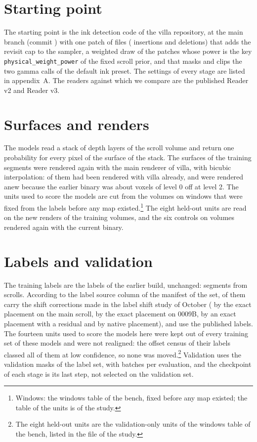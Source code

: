 \section{Starting point}\label{sec:start}

The starting point is the ink detection code of the villa repository, at the main branch (commit \VillaCommit{}) with one patch of \PatchFiles{} files (\PatchIns{} insertions and \PatchDel{} deletions) that adds the revisit cap to the sampler, a weighted draw of the patches whose power is the key \texttt{physical\_weight\_power} of the fixed scroll prior, and that masks and clips the two gamma calls of the default ink preset. The settings of every stage are listed in appendix~A. The readers
against which we compare are the published Reader v2 and Reader v3.

\section{Surfaces and renders}

The models read a stack of \Planes{} depth layers of the scroll volume and return one probability for every pixel
of the surface of the stack. The surfaces of the \TrainSegN{} training segments were rendered again with the main renderer of villa, with bicubic interpolation: \GroupZeroN{} of them had been rendered with villa already, and \GroupTwoN{} were rendered anew because the earlier binary was about \RampVox{} voxels of level 0 off at level 2. The units used to score the
models are cut from the volumes on windows that were fixed from the
labels before any map existed.\footnote{Windows: the windows table of the bench, fixed before
any map existed; the table of the units is  of the study.} The eight held-out units are read on the new renders of the training volumes, and the six controls on volumes rendered again with the current binary.

\section{Labels and validation}\label{sec:labels}

The training labels are the labels of the earlier build, unchanged: \TrainSegN{} segments from \ScrollN{} scrolls. According to the label source column of the manifest of the set, \LabCorrected{} of them carry the shift corrections made in the label shift study of October (\LabExactMain{} by the exact placement on the main scroll, \LabExactNine{} by the exact placement on 0009B, \LabExactG{} by an exact placement with a residual and \LabNative{} by native placement), and \LabPublished{} use the published labels. The fourteen units used to score the
models here were kept out of every training set of these models and were not realigned: the offset census of their labels classed all of them at low confidence, so none was moved.\footnote{The eight held-out units are the
validation-only units of the windows table of the bench, listed in the file
 of the study.} Validation uses the \ValMasks{} validation masks of the label set, with \ValSteps{} batches per evaluation, and the checkpoint of each stage is its last step, not selected on the validation set.

